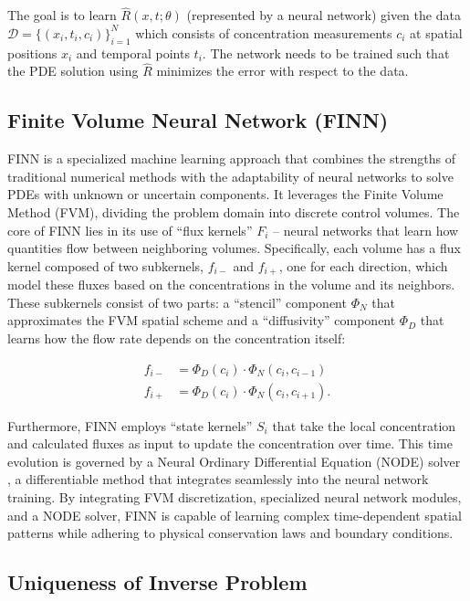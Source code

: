 The goal is to learn $\hat{R}(x,t;\theta)$ (represented by a neural network) given the data $\mathcal{D} = \{ (x_i, t_i, c_i) \}_{i=1}^N$ which consists of concentration measurements $c_i$ at spatial positions $x_i$ and temporal points $t_i$. The network needs to be trained such that the PDE solution using $\hat{R}$ minimizes the error with respect to the data.




\subsection{Finite Volume Neural Network (FINN)}

FINN is a specialized machine learning approach that combines the strengths of traditional numerical methods with the adaptability of neural networks to solve PDEs with unknown or uncertain components. It leverages the Finite Volume Method (FVM), dividing the problem domain into discrete control volumes. The core of FINN lies in its use of ``flux kernels'' $F_i$ – neural networks that learn how quantities flow between neighboring volumes. Specifically, each volume has a flux kernel composed of two subkernels, $f_{i-}$ and $f_{i+}$, one for each direction, which model these fluxes based on the concentrations in the volume and its neighbors. These subkernels consist of two parts: a ``stencil'' component $\Phi_N$ that approximates the FVM spatial scheme and a ``diffusivity'' component $\Phi_D$ that learns how the flow rate depends on the concentration itself:

\begin{align*}
    f_{i-} &= \Phi_D(c_i) \cdot \Phi_N(c_i, c_{i-1}) \\
    f_{i+} &= \Phi_D(c_i) \cdot \Phi_N(c_i, c_{i+1}).
\end{align*}

Furthermore, FINN employs ``state kernels'' $S_i$ that take the local concentration and calculated fluxes as input to update the concentration over time. This time evolution is governed by a Neural Ordinary Differential Equation (NODE) solver \cite{chen2019neuralordinarydifferentialequations}, a differentiable method that integrates seamlessly into the neural network training. By integrating FVM discretization, specialized neural network modules, and a NODE solver, FINN is capable of learning complex time-dependent spatial patterns while adhering to physical conservation laws and boundary conditions.



\subsection{Uniqueness of Inverse Problem}
\label{sec:uniqueness}

